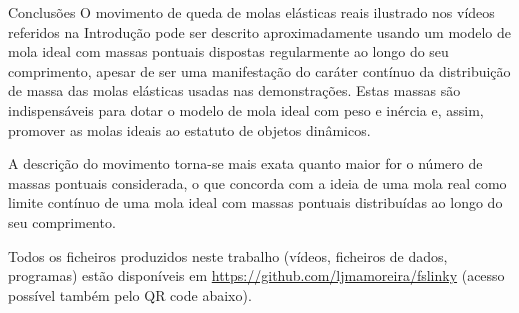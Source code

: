 \documentclass[final]{beamer}
\newlength{\colwidth}
\begin{document}
\begin{frame}[t]
\begin{columns}[t]
\begin{column}{\colwidth}
\begin{exampleblock}{Conclusões}
O movimento de queda de molas elásticas reais ilustrado nos vídeos referidos na
Introdução pode ser descrito aproximadamente usando um modelo de mola ideal com
massas pontuais dispostas regularmente ao longo do seu comprimento, apesar de
ser uma manifestação do caráter contínuo da distribuição de massa das molas
elásticas usadas nas demonstrações. Estas massas são indispensáveis para dotar o
modelo de mola ideal com peso e inércia e, assim, promover as molas ideais ao
estatuto de objetos dinâmicos.

A descrição do movimento torna-se mais exata quanto maior for o número de massas
pontuais considerada, o que concorda com a ideia de uma mola real como limite
contínuo de uma mola ideal com massas pontuais distribuídas ao longo do seu
comprimento. 

Todos os ficheiros produzidos neste trabalho (vídeos, ficheiros de dados, programas) estão disponíveis em \url{https://github.com/ljmamoreira/fslinky} (acesso possível também pelo QR code abaixo).


\end{exampleblock}
\end{column}
\end{columns}
\end{frame}
\end{document}
